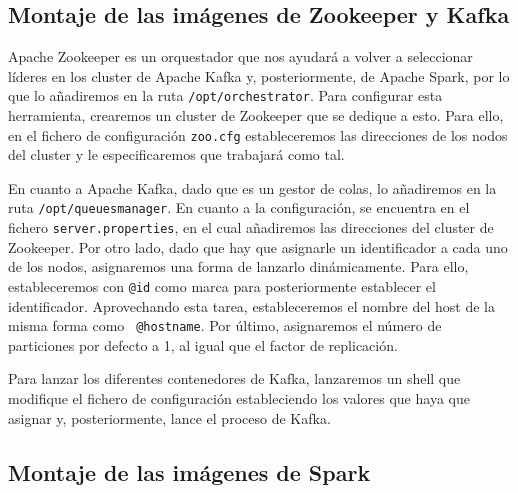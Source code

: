 \subsection{Montaje de las imágenes de Zookeeper y Kafka\label{montKafka}}

Apache Zookeeper es un orquestador que nos ayudará a volver a seleccionar
líderes en los cluster de Apache Kafka y, posteriormente, de Apache Spark,
por lo que lo añadiremos en la ruta {\tt /opt/orchestrator}. Para
configurar esta herramienta, crearemos un cluster de Zookeeper que se
dedique a esto. Para ello, en el fichero de configuración {\tt zoo.cfg}
estableceremos las direcciones de los nodos del cluster y le
especificaremos que trabajará como tal.

En cuanto a Apache Kafka, dado que es un gestor de colas, lo añadiremos en
la ruta {\tt /opt/queuesmanager}. En cuanto a la configuración, se
encuentra en el fichero {\tt server.properties}, en el cual añadiremos las
direcciones del cluster de Zookeeper. Por otro lado, dado que hay que
asignarle un identificador a cada uno de los nodos, asignaremos una forma
de lanzarlo dinámicamente. Para ello, estableceremos con {\tt @id} como
marca para posteriormente establecer el identificador. Aprovechando esta
tarea, estableceremos el nombre del host de la misma forma como {\tt
  @hostname}. Por último, asignaremos el número de particiones por defecto
a 1, al igual que el factor de replicación.

Para lanzar los diferentes contenedores de Kafka, lanzaremos un shell que modifique el fichero de configuración estableciendo los valores que haya que asignar y, posteriormente, lance el proceso de Kafka.


\subsection {Montaje de las imágenes de Spark\label{montSpark}}

